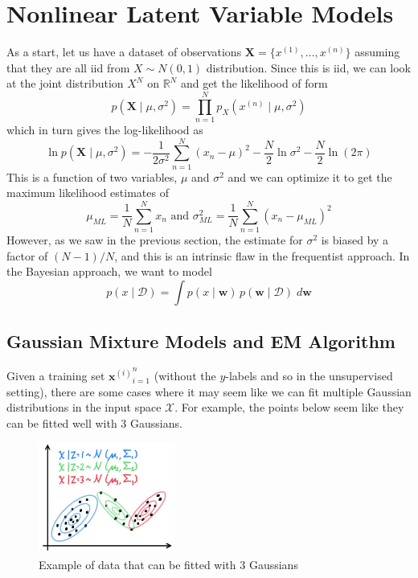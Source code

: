 \section{Nonlinear Latent Variable Models}

    As a start, let us have a dataset of observations $\mathbf{X} = \{x^{(1)}, \ldots, x^{(n)}\}$ assuming that they are all iid from $X \sim N(0, 1)$ distribution. Since this is iid, we can look at the joint distribution $X^N$ on $\mathbb{R}^N$ and get the likelihood of form
    \begin{equation}
      p(\mathbf{X} \mid \mu, \sigma^2) = \prod_{n=1}^N p_X (x^{(n)} \mid \mu, \sigma^2)
    \end{equation}
    which in turn gives the log-likelihood as 
    \begin{equation}
      \ln p(\mathbf{X} \mid \mu, \sigma^2) = -\frac{1}{2 \sigma^2} \sum_{n=1}^N (x_n - \mu)^2 - \frac{N}{2} \ln \sigma^2 - \frac{N}{2} \ln(2 \pi)
    \end{equation}
    This is a function of two variables, $\mu$ and $\sigma^2$ and we can optimize it to get the maximum likelihood estimates of 
    \begin{equation}
      \mu_{ML} = \frac{1}{N} \sum_{n=1}^N x_n \text{ and } \sigma^2_{ML} = \frac{1}{N} \sum_{n=1}^N (x_n - \mu_{ML})^2
    \end{equation}
    However, as we saw in the previous section, the estimate for $\sigma^2$ is biased by a factor of $(N-1)/N$, and this is an intrinsic flaw in the frequentist approach. In the Bayesian approach, we want to model
    \begin{equation}
      p(x \mid \mathcal{D}) = \int p(x \mid \mathbf{w}) \, p(\mathbf{w} \mid \mathcal{D}) \; d\mathbf{w}
    \end{equation}

  \subsection{Gaussian Mixture Models and EM Algorithm}

      Given a training set ${\mathbf{x}^{(i)}}_{i=1}^n$ (without the $y$-labels and so in the unsupervised setting), there are some cases where it may seem like we can fit multiple Gaussian distributions in the input space $\mathcal{X}$. For example, the points below seem like they can be fitted well with 3 Gaussians.

      \begin{figure}[H]
        \centering
        \includegraphics[width=0.4\textwidth]{img/mixture_of_gaussians_example.jpg}
        \caption{Example of data that can be fitted with 3 Gaussians}
      \end{figure}

